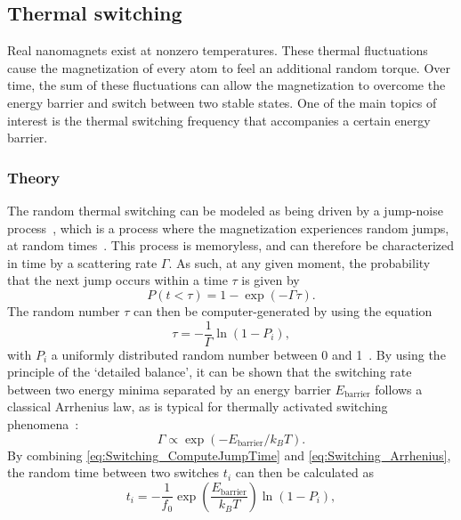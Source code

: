 \documentclass[11pt,a4paper,english,twoside]{article}
\begin{document}
\FloatBarrier
\subsection{Thermal switching}
Real nanomagnets exist at nonzero temperatures. These thermal fluctuations cause the magnetization of every atom to feel an additional random torque. Over time, the sum of these fluctuations can allow the magnetization to overcome the energy barrier and switch between two stable states. One of the main topics of interest is the thermal switching frequency that accompanies a certain energy barrier.

\subsubsection{Theory}
The random thermal switching can be modeled as being driven by a jump-noise process~\cite{MagDynamics_JumpNoise}, which is a process where the magnetization experiences random jumps, at random times~\cite{RandomSwitch_MonteCarlo}. This process is memoryless, and can therefore be characterized in time by a scattering rate $\Gamma$. As such, at any given moment, the probability that the next jump occurs within a time $\tau$ is given by
\begin{equation}
    P(t < \tau) = 1-\exp(-\Gamma \tau) \mathrm{.}
    \label{eq:Switching_ProbabilityJumpInTime}
\end{equation}
The random number $\tau$ can then be computer-generated by using the equation
\begin{equation}
    \tau = -\frac{1}{\Gamma} \ln(1-P_i) \mathrm{,}
    \label{eq:Switching_ComputeJumpTime}
\end{equation}
with $P_i$ a uniformly distributed random number between 0 and 1~\cite{RandomSwitch_MonteCarlo}.
By using the principle of the `detailed balance', it can be shown that the switching rate between two energy minima separated by an energy barrier $E_{\mathrm{barrier}}$ follows a classical Arrhenius law, as is typical for thermally activated switching phenomena~\cite{MagDynamics_JumpNoise}:
\begin{equation}
    \Gamma \propto \exp(-E_{\mathrm{barrier}}/k_B T) \mathrm{.}
    \label{eq:Switching_Arrhenius}
\end{equation}
By combining \eqref{eq:Switching_ComputeJumpTime} and \eqref{eq:Switching_Arrhenius}, the random time between two switches $t_i$ can then be calculated as
\begin{equation}
    t_i = -\frac{1}{f_0} \exp(\frac{E_{\mathrm{barrier}}}{k_B T}) \ln(1-P_i) \mathrm{,}
    \label{eq:Switching_time}
\end{equation}
\end{document}
